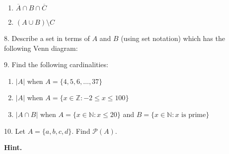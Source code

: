 \documentclass[10pt,]{book}
\theoremstyle{plain}
\theoremstyle{definition}
\numberwithin{equation}{chapter}
\def\N{\mathbb N}
\def\Z{\mathbb Z}
\def\pow{\mathcal P}
\def\st{:}
\renewcommand{\bar}{\overline}
\begin{document}
\begin{exerciselist}
\begin{enumerate}[label=(\alph*)]
\item\hypertarget{li-113}{}\(\bar A \cap B \cap \bar C\)%
\item\hypertarget{li-114}{}\((A \cup B) \setminus C\)%
\end{enumerate}
\par\smallskip
\item[8.]\hypertarget{exercise-18}{}
          Describe a set in terms of \(A\) and \(B\) (using set notation) which has the following Venn diagram:
\leavevmode%
\begin{figure}
\centering
{
}
\end{figure}
\par\smallskip
\item[9.]\hypertarget{exercise-19}{}
          Find the following cardinalities:
\leavevmode%
\begin{enumerate}[label=(\alph*)]
\item\hypertarget{li-121}{}\(|A|\) when \(A = \{4,5,6,\ldots,37\}\)%
\item\hypertarget{li-122}{}\(|A|\) when \(A = \{x \in \Z \st -2 \le x \le 100\}\)%
\item\hypertarget{li-123}{}\(|A \cap B|\) when \(A = \{x \in \N \st x \le 20\}\) and \(B = \{x \in \N \st x \mbox{ is prime} \}\)%
\end{enumerate}
\par\smallskip
\item[10.]\hypertarget{exercise-20}{}
          Let \(A = \{a, b, c, d\}\). Find \(\pow(A)\).
\par\smallskip
\par\smallskip
\noindent\textbf{Hint.}\hypertarget{hint-2}{}\quad


\end{exerciselist}
\end{document}
